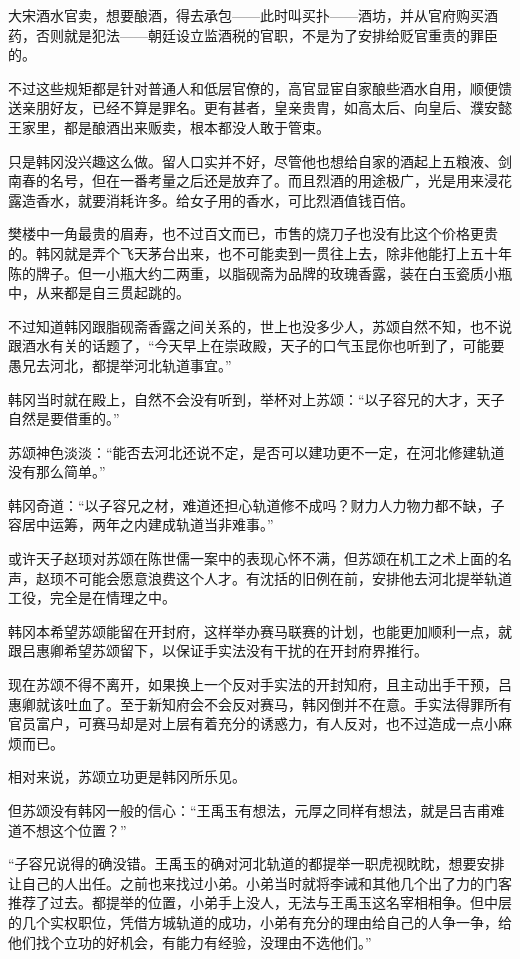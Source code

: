 大宋酒水官卖，想要酿酒，得去承包——此时叫买扑——酒坊，并从官府购买酒药，否则就是犯法——朝廷设立监酒税的官职，不是为了安排给贬官重责的罪臣的。

不过这些规矩都是针对普通人和低层官僚的，高官显宦自家酿些酒水自用，顺便馈送亲朋好友，已经不算是罪名。更有甚者，皇亲贵胄，如高太后、向皇后、濮安懿王家里，都是酿酒出来贩卖，根本都没人敢于管束。

只是韩冈没兴趣这么做。留人口实并不好，尽管他也想给自家的酒起上五粮液、剑南春的名号，但在一番考量之后还是放弃了。而且烈酒的用途极广，光是用来浸花露造香水，就要消耗许多。给女子用的香水，可比烈酒值钱百倍。

樊楼中一角最贵的眉寿，也不过百文而已，市售的烧刀子也没有比这个价格更贵的。韩冈就是弄个飞天茅台出来，也不可能卖到一贯往上去，除非他能打上五十年陈的牌子。但一小瓶大约二两重，以脂砚斋为品牌的玫瑰香露，装在白玉瓷质小瓶中，从来都是自三贯起跳的。

不过知道韩冈跟脂砚斋香露之间关系的，世上也没多少人，苏颂自然不知，也不说跟酒水有关的话题了，“今天早上在崇政殿，天子的口气玉昆你也听到了，可能要愚兄去河北，都提举河北轨道事宜。”

韩冈当时就在殿上，自然不会没有听到，举杯对上苏颂：“以子容兄的大才，天子自然是要借重的。”

苏颂神色淡淡：“能否去河北还说不定，是否可以建功更不一定，在河北修建轨道没有那么简单。”

韩冈奇道：“以子容兄之材，难道还担心轨道修不成吗？财力人力物力都不缺，子容居中运筹，两年之内建成轨道当非难事。”

或许天子赵顼对苏颂在陈世儒一案中的表现心怀不满，但苏颂在机工之术上面的名声，赵顼不可能会愿意浪费这个人才。有沈括的旧例在前，安排他去河北提举轨道工役，完全是在情理之中。

韩冈本希望苏颂能留在开封府，这样举办赛马联赛的计划，也能更加顺利一点，就跟吕惠卿希望苏颂留下，以保证手实法没有干扰的在开封府界推行。

现在苏颂不得不离开，如果换上一个反对手实法的开封知府，且主动出手干预，吕惠卿就该吐血了。至于新知府会不会反对赛马，韩冈倒并不在意。手实法得罪所有官员富户，可赛马却是对上层有着充分的诱惑力，有人反对，也不过造成一点小麻烦而已。

相对来说，苏颂立功更是韩冈所乐见。

但苏颂没有韩冈一般的信心：“王禹玉有想法，元厚之同样有想法，就是吕吉甫难道不想这个位置？”

“子容兄说得的确没错。王禹玉的确对河北轨道的都提举一职虎视眈眈，想要安排让自己的人出任。之前也来找过小弟。小弟当时就将李诫和其他几个出了力的门客推荐了过去。都提举的位置，小弟手上没人，无法与王禹玉这名宰相相争。但中层的几个实权职位，凭借方城轨道的成功，小弟有充分的理由给自己的人争一争，给他们找个立功的好机会，有能力有经验，没理由不选他们。”

